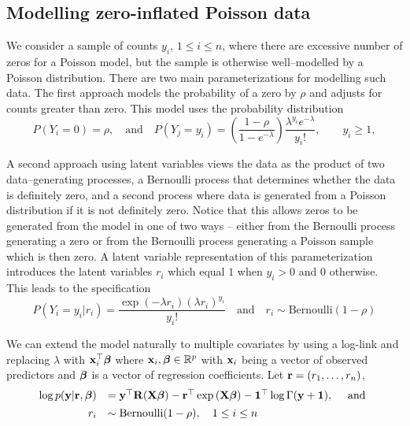 \documentclass{amsart}[12pt]
\begin{document}
\subsection{Modelling zero-inflated Poisson data}

We consider a sample of counts $y_i$, $1 \le i\le n$, where there are excessive number of zeros for a Poisson
model, but the sample is otherwise well--modelled by a Poisson distribution. There are two main
parameterizations for modelling such data. The first approach models the probability of a zero by $\rho$ and
adjusts for counts greater than zero. This model uses the probability distribution
\[
	P(Y_i = 0) = \rho, 
	\quad \mbox{and} \quad 
	P(Y_j = y_i) = \left( \frac{1 - \rho}{1 - e^{-\lambda}} \right) \frac{\lambda^{y_i} e^{-\lambda}} {y_i!},\qquad y_i \ge 1,
\]

A second approach using latent variables views the data as the product of two data--generating processes, a
Bernoulli process that determines whether the data is definitely zero, and a second process where data is generated from a Poisson distribution if it is not definitely zero.
Notice that this allows zeros to be generated from the model in one of two ways -- either from the Bernoulli
process generating a zero or from the Bernoulli process generating a Poisson sample which is then zero.
A latent variable representation of this parameterization introduces the latent variables $r_i$ which
equal $1$ when $y_i>0$ and $0$ otherwise. This leads to the specification
\[
	P(Y_i=y_i|r_i) = \frac{\exp(-\lambda r_i)(\lambda r_i)^{y_i}}{y_i!} \quad \mbox{and} \quad r_i \sim \mbox{Bernoulli}(1-\rho)
\]

We can extend the model naturally to multiple covariates by using a log-link and replacing $\lambda$
with ${\bf x}_i^\top {\boldsymbol\beta}$ where ${\bf x}_i,{\boldsymbol \beta}\in{\mathbb R}^p$ with ${\bf x}_i$ being a vector of observed predictors and
${\boldsymbol \beta}$ is  a vector of regression coefficients. Let ${\bf r} = (r_1,\ldots,r_n)$,
\[%
	\begin{array}{rl}
		\log p(\vy|\vr, \vbeta) 
		    & = \vy^\top \mR (\mX\vbeta)                           
		- \vr^\top \exp{(\mX\vbeta)} 
		- \vone^\top \log{\Gamma{(\vy + \vone)}}, \quad \mbox{ and }\\ [1ex]
		r_i & \sim \text{Bernoulli}(1-\rho), \quad 1 \leq i \leq n \\
	\end{array}
\]
\end{document}
